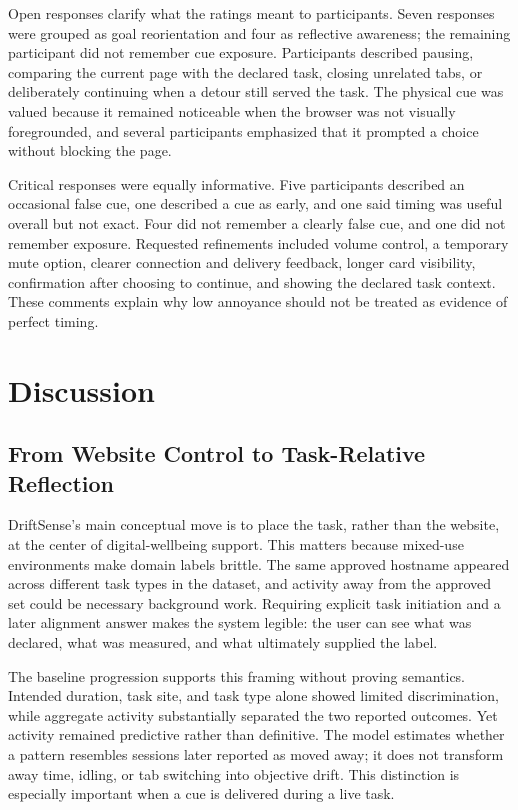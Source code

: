 \documentclass[12pt,a4paper]{article}
\begin{document}
Open responses clarify what the ratings meant to participants. Seven responses were grouped as goal reorientation and four as reflective awareness; the remaining participant did not remember cue exposure. Participants described pausing, comparing the current page with the declared task, closing unrelated tabs, or deliberately continuing when a detour still served the task. The physical cue was valued because it remained noticeable when the browser was not visually foregrounded, and several participants emphasized that it prompted a choice without blocking the page.

Critical responses were equally informative. Five participants described an occasional false cue, one described a cue as early, and one said timing was useful overall but not exact. Four did not remember a clearly false cue, and one did not remember exposure. Requested refinements included volume control, a temporary mute option, clearer connection and delivery feedback, longer card visibility, confirmation after choosing to continue, and showing the declared task context. These comments explain why low annoyance should not be treated as evidence of perfect timing.

\section{Discussion}

\subsection{From Website Control to Task-Relative Reflection}

DriftSense's main conceptual move is to place the task, rather than the website, at the center of digital-wellbeing support. This matters because mixed-use environments make domain labels brittle. The same approved hostname appeared across different task types in the dataset, and activity away from the approved set could be necessary background work. Requiring explicit task initiation and a later alignment answer makes the system legible: the user can see what was declared, what was measured, and what ultimately supplied the label.

The baseline progression supports this framing without proving semantics. Intended duration, task site, and task type alone showed limited discrimination, while aggregate activity substantially separated the two reported outcomes. Yet activity remained predictive rather than definitive. The model estimates whether a pattern resembles sessions later reported as moved away; it does not transform away time, idling, or tab switching into objective drift. This distinction is especially important when a cue is delivered during a live task.
\end{document}
